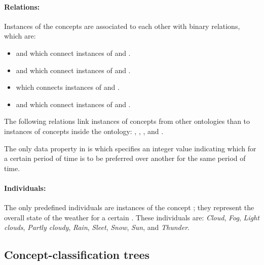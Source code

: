\paragraph{Relations:}

Instances of the concepts are associated to each other with binary relations, which are:

\begin{itemize}
  \item {} and  which connect instances of  and .
  \item {} and  which connect instances of  and .
  \item {} which connects instances of  and .
  \item {} and  which connect instances of  and .
\end{itemize}

The following relations link instances of concepts from other ontologies than \thinkhomeweather to instances of concepts inside the ontology: , , , and .

The only data property in \thinkhomeweather is  which specifies an integer value indicating which  for a certain period of time is to be preferred over another  for the same period of time.

\paragraph{Individuals:}

The only predefined individuals are instances of the concept ; they represent the overall state of the weather for a certain . These individuals are: \emph{Cloud}, \emph{Fog}, \emph{Light clouds}, \emph{Partly cloudy}, \emph{Rain}, \emph{Sleet}, \emph{Snow}, \emph{Sun}, and \emph{Thunder}.

\subsection{Concept-classification trees}
\label{sec:concept_classification_trees}

